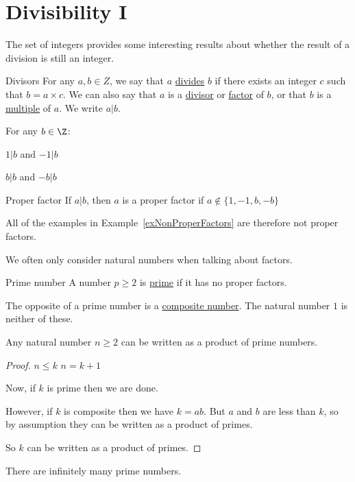 \documentclass[../Main.tex]{subfiles}
\begin{document}
\section{Divisibility I}
The set of integers provides some interesting results about whether the result of a division is still an integer.
\begin{definition}{Divisors}
    For any $a, b \in Z$, we say that $a$ \underline{divides} $b$ if there exists an integer $c$ such that $b = a \times c$. We can also say that $a$ is a \underline{divisor} or \underline{factor} of $b$, or that $b$ is a \underline{multiple} of $a$. We write $a | b$.
\end{definition}
\begin{examples}{
        For any $b \in \Z$:
        \label{exNonProperFactors}
    }
    \item $1 | b$ and $-1 | b$
    \item $b | b$ and $-b | b$    
\end{examples}
\begin{definition}{Proper factor}
    If $a | b$, then $a$ is a proper factor if $a \notin \{1, -1, b, -b\}$
\end{definition}
All of the examples in Example~\ref{exNonProperFactors} are therefore not proper factors.\par
We often only consider natural numbers when talking about factors.
\begin{definition}{Prime number}
    A number $p \geq 2$ is \underline{prime} if it has no proper factors.
\end{definition}
The opposite of a prime number is a \underline{composite number}. The natural number $1$ is neither of these.
\begin{proposition}
    Any natural number $n \geq 2$ can be written as a product of prime numbers.
    \label{propPrimeFactorisation}
\end{proposition}
\begin{proof}
    {$n \leq k$}{}
    {$n = k + 1$}{
        Now, if $k$ is prime then we are done.\par
        However, if $k$ is composite then we have $k = ab$. But $a$ and $b$ are less than $k$, so by assumption they can be written as a product of primes.\par
        So $k$ can be written as a product of primes.
    }
\end{proof}
\begin{theorem}
    There are infinitely many prime numbers.
    \label{thmInfinitePrimes}
\end{theorem}
\end{document}
